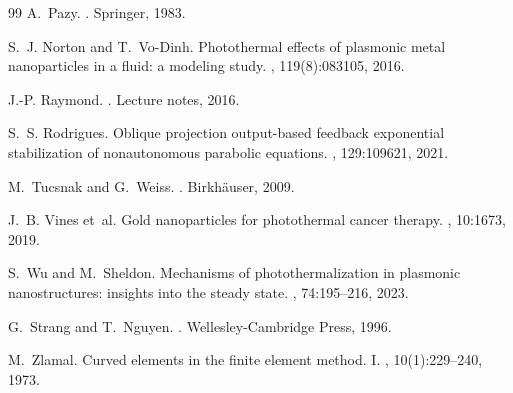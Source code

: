 \documentclass[11pt,a4paper]{article}
\numberwithin{equation}{section}
\theoremstyle{definition}
\newcommand{\1}{\mathbbm{1}}
\begin{document}
\begin{thebibliography}{99}
A.~Pazy.
.
\newblock Springer, 1983.

S.~J. Norton and T.~Vo-Dinh.
\newblock Photothermal effects of plasmonic metal nanoparticles in a fluid: a modeling study.
, 119(8):083105, 2016.

J.-P. Raymond.
.
\newblock Lecture notes, 2016.

S.~S. Rodrigues.
\newblock Oblique projection output-based feedback exponential stabilization of nonautonomous parabolic equations.
, 129:109621, 2021.

M.~Tucsnak and G.~Weiss.
.
\newblock Birkh\"auser, 2009.

J.~B. Vines et~al.
\newblock Gold nanoparticles for photothermal cancer therapy.
, 10:1673, 2019.

S.~Wu and M.~Sheldon.
\newblock Mechanisms of photothermalization in plasmonic nanostructures: insights into the steady state.
, 74:195--216, 2023.

G.~Strang and T.~Nguyen.
.
\newblock Wellesley-Cambridge Press, 1996.





M.~Zlamal.
\newblock Curved elements in the finite element method. {I}.
, 10(1):229--240, 1973.


\end{thebibliography}
\end{document}
